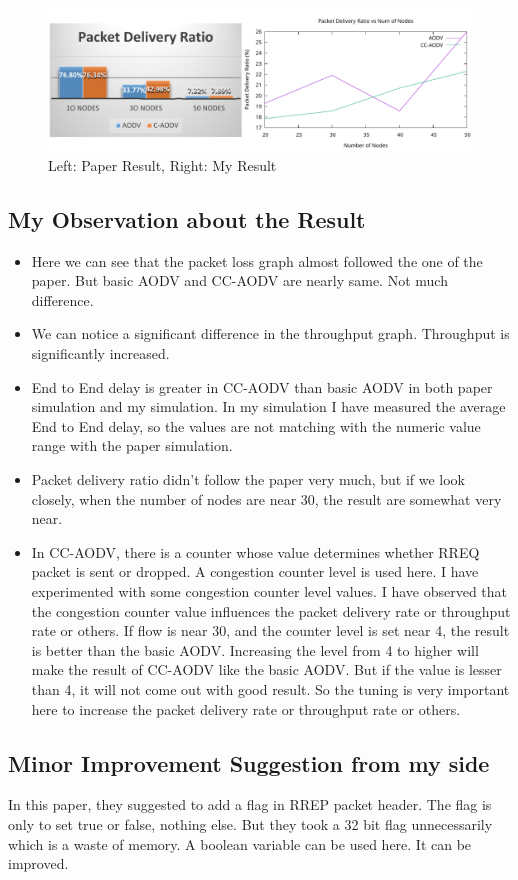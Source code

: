 \documentclass[12pt, a4paper]{article}
\begin{document}
\begin{figure}[H]
\centering
\includegraphics[scale = 0.4]{images/paper/matching-04.png}
\caption{Left: Paper Result, Right: My Result}
\end{figure}
\subsection{My Observation about the Result}
\begin{itemize}
    \item Here we can see that the packet loss graph almost followed the one of the paper. But basic AODV and CC-AODV are nearly same. Not much difference.
    \item We can notice a significant difference in the throughput graph. Throughput is significantly increased.
    \item End to End delay is greater in CC-AODV than basic AODV in both paper simulation and my simulation. In my simulation I have measured the average End to End delay, so the values are not matching with the numeric value range with the paper simulation.
    \item Packet delivery ratio didn't follow the paper very much, but if we look closely, when the number of nodes are near 30, the result are somewhat very near.
    \item In CC-AODV, there is a counter whose value determines whether RREQ packet is sent or dropped. A congestion counter level is used here. I have experimented with some congestion counter level values. I have observed that the congestion counter value influences the packet delivery rate or throughput rate or others. If flow is near 30, and the counter level is set near 4, the result is better than the basic AODV. Increasing the level from 4 to higher will make the result of CC-AODV like the basic AODV. But if the value is lesser than 4, it will not come out with good result. So the tuning is very important here to increase the packet delivery rate or throughput rate or others.
\end{itemize}
\subsection{Minor Improvement Suggestion from my side}
In this paper, they suggested to add a flag in RREP packet header. The flag is only to set true or false, nothing else. But they took a 32 bit flag unnecessarily which is a waste of memory. A boolean variable can be used here. It can be improved.
\end{document}
